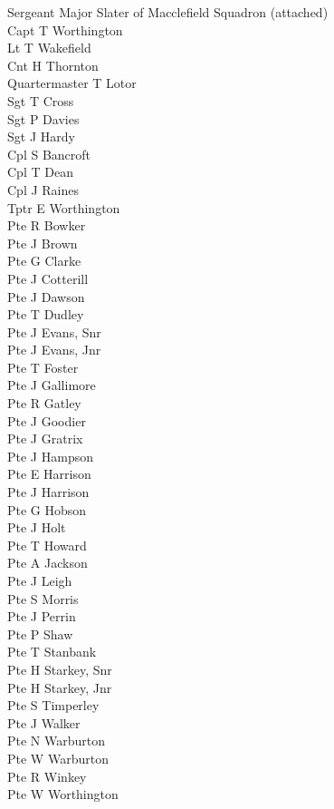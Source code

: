 \begin{multicols}{2}
  \noindent
  Sergeant Major Slater of Macclefield Squadron (attached) \\
  Capt T Worthington \\
  Lt T Wakefield \\
  Cnt H Thornton \\
  Quartermaster T Lotor \\
  Sgt T Cross \\
  Sgt P Davies \\
  Sgt J Hardy \\
  Cpl S Bancroft \\
  Cpl T Dean \\
  Cpl J Raines \\
  Tptr E Worthington \\
  Pte R Bowker \\
  Pte J Brown \\
  Pte G Clarke \\
  Pte J Cotterill \\
  Pte J Dawson \\
  Pte T Dudley \\
  Pte J Evans, Snr \\
  Pte J Evans, Jnr \\
  Pte T Foster \\
  Pte J Gallimore \\
  Pte R Gatley \\
  Pte J Goodier \\
  Pte J Gratrix \\
  Pte J Hampson \\
  Pte E Harrison \\
  Pte J Harrison \\
  Pte G Hobson \\
  Pte J Holt \\
  Pte T Howard \\
  Pte A Jackson \\
  Pte J Leigh \\
  Pte S Morris \\
  Pte J Perrin \\
  Pte P Shaw \\
  Pte T Stanbank \\
  Pte H Starkey, Snr \\
  Pte H Starkey, Jnr \\
  Pte S Timperley \\
  Pte J Walker \\
  Pte N Warburton \\
  Pte W Warburton \\
  Pte R Winkey \\
  Pte W Worthington \\
\end{multicols}

